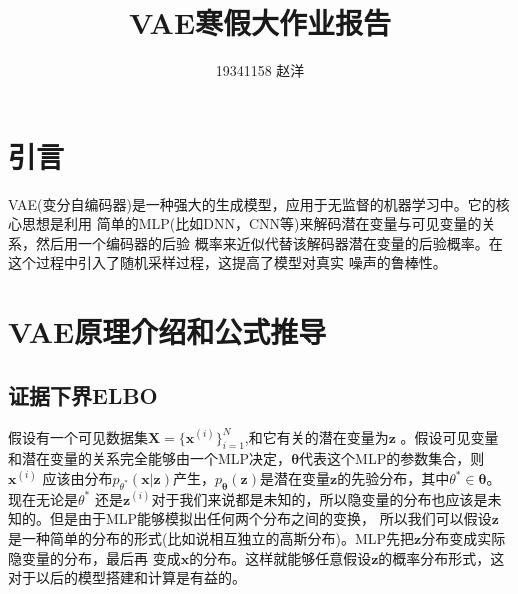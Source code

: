 \documentclass[UTF8]{ctexart}
\title{VAE寒假大作业报告}
\author{19341158 赵洋}
\newcommand*{\bb}[1]{\mathbf{#1}}
\begin{document}
\maketitle
\section{引言}
VAE(变分自编码器)\cite{1312.6114}是一种强大的生成模型，应用于无监督的机器学习中。它的核心思想是利用
简单的MLP(比如DNN，CNN等)来解码潜在变量与可见变量的关系，然后用一个编码器的后验
概率来近似代替该解码器潜在变量的后验概率。在这个过程中引入了随机采样过程，这提高了模型对真实
噪声的鲁棒性。
\section{VAE原理介绍和公式推导}
\subsection{证据下界ELBO}
假设有一个可见数据集$\mathbf X=\{\mathbf{x}^{(i)}\}_{i=1}^N$,和它有关的潜在变量为$\mathbf{z}$
。假设可见变量和潜在变量的关系完全能够由一个MLP决定，$\bm{\theta}$代表这个MLP的参数集合，则$\mathbf{x}^{(i)}$
应该由分布$p_{\theta^*}(\bb x|\bb z)$产生，$p_{\bm\theta}(\bb z)$是潜在变量$\bb z$的先验分布，其中${\theta^*}\in\bm{\theta}$。现在无论是${\theta^*}$
还是$\bb z^{(i)}$对于我们来说都是未知的，所以隐变量的分布也应该是未知的。但是由于MLP能够模拟出任何两个分布之间的变换，
所以我们可以假设$\bb z$是一种简单的分布的形式(比如说相互独立的高斯分布)。MLP先把$\bb z$分布变成实际隐变量的分布，最后再
变成$\bb x$的分布。这样就能够任意假设$\bb z$的概率分布形式，这对于以后的模型搭建和计算是有益的。
\end{document}
